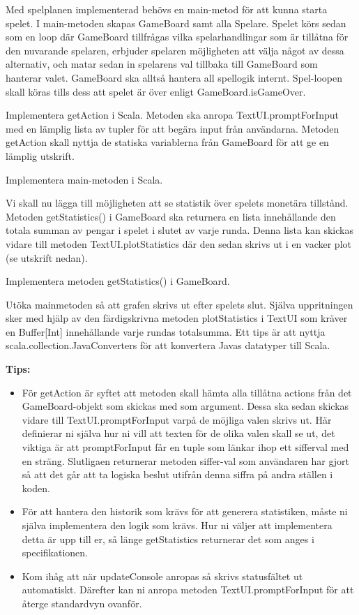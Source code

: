 \Task Med spelplanen implementerad behövs en main-metod för att kunna starta spelet. I main-metoden skapas GameBoard samt alla Spelare. Spelet körs sedan som en loop där GameBoard tillfrågas vilka spelarhandlingar som är tillåtna för den nuvarande spelaren, erbjuder spelaren möjligheten att välja något av dessa alternativ, och matar sedan in spelarens val tillbaka till GameBoard som hanterar valet. GameBoard ska alltså hantera all spellogik internt.  Spel-loopen skall köras tills dess att spelet är över enligt GameBoard.isGameOver. 

\Subtask Implementera getAction i Scala. Metoden ska anropa TextUI.promptForInput med en lämplig lista av tupler för att begära input från användarna. Metoden getAction skall nyttja de statiska variablerna från GameBoard för att ge en lämplig utskrift.

\Subtask Implementera main-metoden i Scala.

\Task Vi skall nu lägga till möjligheten att se statistik över spelets monetära tillstånd. Metoden getStatistics() i GameBoard  ska returnera en lista innehållande den totala summan av pengar i spelet i slutet av varje runda. Denna lista kan skickas vidare till metoden TextUI.plotStatistics där den sedan skrivs ut i en vacker plot (se utskrift nedan). 

\Subtask Implementera metoden getStatistics() i GameBoard.

\Subtask Utöka mainmetoden så att grafen skrivs ut efter spelets slut. 
Själva uppritningen sker med hjälp av den färdigskrivna metoden plotStatistics i TextUI som kräver en Buffer[Int] innehållande varje rundas totalsumma. 
Ett tips är att nyttja scala.collection.JavaConverters för att konvertera Javas datatyper till Scala.

\textbf{Tips:}

\begin{itemize}
\item  För getAction är syftet att metoden skall hämta alla tillåtna actions från det GameBoard-objekt som skickas med som argument. Dessa ska sedan skickas vidare till TextUI.promptForInput varpå de möjliga valen skrivs ut. Här definierar ni själva hur ni vill att texten för de olika valen skall se ut, det viktiga är att promptForInput får en tuple som länkar ihop ett sifferval med en sträng. Slutligaen returnerar metoden siffer-val som användaren har gjort så att det går att ta logiska beslut utifrån denna siffra på andra ställen i koden.

\item  För att hantera den historik som krävs för att generera statistiken, måste ni själva implementera den logik som krävs. Hur ni väljer att implementera detta är upp till er, så länge getStatistics returnerar det som anges i specifikationen.
\item Kom ihåg att när updateConsole anropas så skrivs statusfältet ut automatiskt. Därefter kan ni anropa metoden TextUI.promptForInput för att återge standardvyn ovanför.

\end{itemize}

